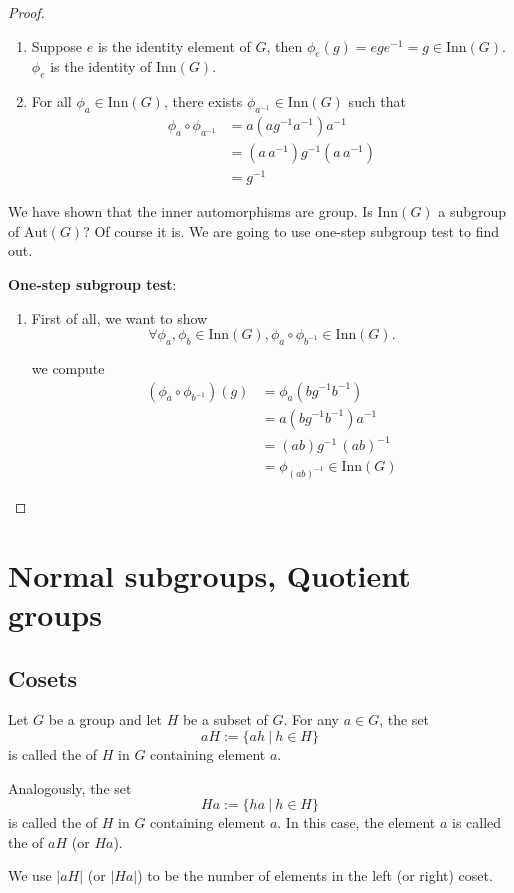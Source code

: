 \begin{proof}
\begin{enumerate}
        \item Suppose $e$ is the identity element of $G$, then $\phi_e(g) = ege^{-1} = g \in \text{Inn}(G)$. $\phi_e$ is the 
        identity of $\text{Inn}(G)$.

        \item For all $\phi_a \in \text{Inn}(G)$, there exists $\phi_{a^{-1}} \in \text{Inn}(G)$ such that 
        \begin{align*}
            \phi_a \circ \phi_{a^{-1}} &= a(a g^{-1} a^{-1})a^{-1}\\
            &= (a\,a^{-1}) g^{-1} (a\,a^{-1})\\
            &= g^{-1}
        \end{align*}
    \end{enumerate}

    We have shown that the inner automorphisms are group. Is $\text{Inn}(G)$ a subgroup of $\text{Aut}(G)$? Of course it is. We 
    are going to use one-step subgroup test to find out.

    \textbf{One-step subgroup test}:

    \begin{enumerate}
        \item First of all, we want to show 
        \[
            \forall \phi_a, \phi_b \in \text{Inn}(G), \phi_a \circ \phi_{b^{-1}} \in \text{Inn}(G).
        \]

        we compute
        \begin{align*}
            (\phi_a \circ \phi_{b^{-1}})(g) &= \phi_a (b g^{-1}b^{-1})\\
            &= a(b g^{-1}b^{-1})a^{-1}\\
            &= (ab)g^{-1}\,(ab)^{-1}\\
            &= \phi_{(ab)^{-1}} \in \text{Inn}(G)
        \end{align*}
    \end{enumerate}
\end{proof}

\section{Normal subgroups, Quotient groups}

\subsection{Cosets}

\begin{definition}[Cosets]
    Let $G$ be a group and let $H$ be a subset of $G$. For any $a \in G$, the set 
    \[
        aH := \{ ah \> | \> h\in H\}
    \]
    is called the  of $H$ in $G$ containing element $a$. 

    Analogously, the set 
    \[
        Ha := \{ ha \> | \> h\in H\}
    \]
    is called the  of $H$ in $G$ containing element $a$.
    In this case, the element $a$ is called the  of 
    $aH$ (or $Ha$). 

    We use $|aH|$ (or $|Ha|$) to be the number of elements in the left (or right) coset.
\end{definition}

